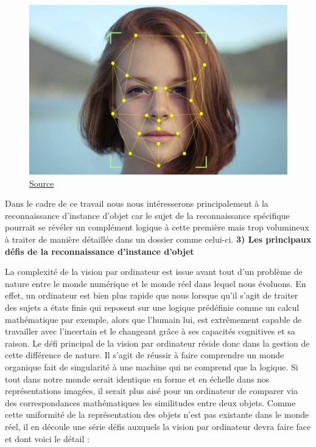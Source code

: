 \documentclass[a4paper,12pt]{article} %
\begin{document}
\begin{figure}[h] %
  \centering %
  \includegraphics[scale=0.45]{face.jpg} %
  \caption{\href{https://www.eu-startups.com/2020/12/facial-recognition-tech-risks-regulations-and-future-startup-opportunities-in-the-eu/}{Source} }
\end{figure}
\newline
\par
Dans le cadre de ce travail nous nous intéresserons principalement à la reconnaissance d’instance d’objet car le sujet de la reconnaissance spécifique pourrait se révéler un complément logique à cette première mais trop volumineux à traiter de manière détaillée dans un dossier comme celui-ci.
\newpage
\textbf{3) Les principaux défis de la reconnaissance d’instance d’objet}
\newline
\par
	La complexité de la vision par ordinateur est issue avant tout d’un problème de nature entre le monde numérique et le monde réel dans lequel nous évoluons. En effet, un ordinateur est bien plus rapide que nous lorsque qu’il s’agit de traiter des sujets a états finis qui reposent sur une logique prédéfinie comme un calcul mathématique par exemple, alors que l’humain lui, est extrêmement capable de travailler avec l’incertain et le changeant grâce à ses capacités cognitives et sa raison. Le défi principal de la vision par ordinateur réside donc dans la gestion de cette différence de nature. Il s’agit de réussir à faire comprendre un monde organique fait de singularité à une machine qui ne comprend que la logique. Si tout dans notre monde serait identique en forme et en échelle dans nos représentations imagées, il serait plus aisé pour un ordinateur de comparer via des correspondances mathématiques les similitudes entre deux objets. Comme cette uniformité de la représentation des objets n’est pas existante dans le monde réel, il en découle une série défis auxquels la vision par ordinateur devra faire face et dont voici le détail :\newline
\par
\end{document}
